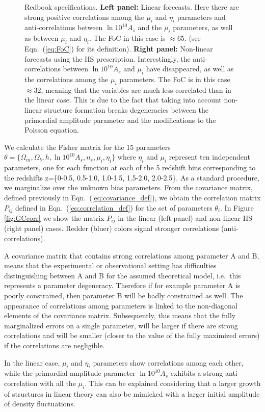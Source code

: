 \begin{figure}[H]
{Redbook specifications. \textbf{Left panel:}
Linear forecasts. Here there are strong positive correlations among the $\mu_i$ and $\eta_i$ parameters and anti-correlations between
 $\ln10^{10}A_{s}$  and the $\mu_i$ parameters, as well as between $\mu_i$ and $\eta_i$. The FoC in this case is $\approx 65$. (see Eqn.\ (\ref{eq:FoC}) for its definition).
\textbf{Right panel: } Non-linear 
forecasts using the HS prescription. Interestingly, the anti-correlations between  $\ln10^{10}A_{s}$  and $\mu_i$ 
have disappeared, as well as the correlations among the  $\mu_i$ parameters. The FoC is in this case   $\approx 32$, meaning that the variables are much less correlated than in the linear case.
This is due to the fact that taking into account non-linear structure formation breaks degeneracies between the primordial amplitude parameter and the modifications
to the Poisson equation.}
\end{figure}


We calculate the Fisher matrix for the 15 parameters
$\theta=\{\Omega_{m},\Omega_{b},h,\ln10^{10}A_{s},n_{s},\mu_{i},\eta_{i}\}$
where $\eta_{i}$ and $\mu_{i}$ represent ten independent parameters, one for each function
at each of the 5 redshift bins corresponding to the redshifts z=\{0-0.5, 0.5-1.0, 1.0-1.5, 1.5-2.0, 2.0-2.5\}. As a standard procedure, we marginalize over the unknown bias parameters.
From the covariance matrix, defined
previously in Eqn.\ (\ref{eq:covariance_def}), we obtain the correlation
matrix $P_{ij}$ defined in Eqn.\ (\ref{eq:correlation_def}) for the
set of parameters $\theta_{i}$. In Figure \ref{fig:GCcorr} we show
the matrix $P_{ij}$ in the linear (left panel) and non-linear-HS
(right panel) cases. Redder (bluer) colors signal stronger correlations
(anti-correlations). 

A covariance matrix that contains strong correlations among parameter A and B, means that the 
experimental or observational setting has difficulties distinguishing between A and B for the assumed theoretical model, i.e.\ this represents a parameter degeneracy.
Therefore if for example parameter A is poorly constrained, then parameter B will be badly constrained as well.
The appearance of correlations among parameters is linked to the non-diagonal elements of the covariance matrix. Subsequently, this means that
the fully marginalized errors on a single parameter, will be larger if there are strong correlations and will be smaller (closer to the value of the
fully maximized errors) if the correlations are negligible.

In the linear case, $\mu_{i}$ and $\eta_{i}$ parameters show correlations
among each other, while the primordial
 amplitude parameter $\ln10^{10}A_{s}$ exhibits a strong anti-correlation with all the $\mu_{i}$.
This can be explained considering that a larger growth of
structures in linear theory can also be mimicked with a larger initial
amplitude of density fluctuations.

